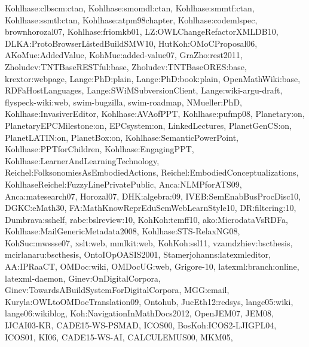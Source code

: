 {Kohlhase:clbscm:ctan,
Kohlhase:smomdl:ctan,
Kohlhase:smmtf:ctan,
Kohlhase:ssmtl:ctan,
Kohlhase:atpm98chapter,
Kohlhase:codemlspec,
brownhorozal07,
Kohlhase:friomkb01,
LZ:OWLChangeRefactorXMLDB10,
DLKA:ProtoBrowserListedBuildSMW10,
HutKoh:OMoCProposal06,
AKoMue:AddedValue,
KohMue:added-value07,
GraZho:rest2011,
Zholudev:TNTBaseRESTful:base,
Zholudev:TNTBaseORES:base,
krextor:webpage,
Lange:PhD:plain,
Lange:PhD:book:plain,
OpenMathWiki:base,
RDFaHostLanguages,
Lange:SWiMSubversionClient,
Lange:wiki-argu-draft,
flyspeck-wiki:web,
swim-bugzilla,
swim-roadmap,
NMueller:PhD,
Kohlhase:InvasiverEditor,
Kohlhase:AVAofPPT,
Kohlhase:pufmp08,
Planetary:on,
PlanetaryEPCMilestone:on,
EPCsystem:on,
LinkedLectures,
PlanetGenCS:on, 
PlanetLATIN:on,
PlanetBox:on,
Kohlhase:SemanticPowerPoint,
Kohlhase:PPTforChildren,
Kohlhase:EngagingPPT,
Kohlhase:LearnerAndLearningTechnology,
Reichel:FolksonomiesAsEmbodiedActions,
Reichel:EmbodiedConceptualizations,
KohlhaseReichel:FuzzyLinePrivatePublic,
Anca:NLMPforATS09,
Anca:matesearch07,
Horozal07,
DHK:algebra:09,
IVEB:SemEnabBusProcDisc10,
DGKC:eMath30,
FA:MathKnowReprEduSemWebLearnStyle10,
DR:filtering:10,
Dumbrava:sshelf,
rabe:bslreview:10,
KohKoh:tcmff10,
ako:MicrodataVsRDFa,
Kohlhase:MailGenericMetadata2008,
Kohlhase:STS-RelaxNG08,
KohSuc:mwssse07,
xslt:web,
mmlkit:web,
KohKoh:ssl11,
vzamdzhiev:bscthesis,
mcirlanaru:bscthesis,
OntoIOpOASIS2001,
Stamerjohanns:latexmleditor,
AA:IPRaaCT,
OMDoc:wiki,
OMDocUG:web,
Grigore-10,
latexml:branch:online,
latexml-daemon,
Ginev:OnDigitalCorpora,
Ginev:TowardsABuildSystemForDigitalCorpora,
MGG:email,
Kuryla:OWLtoOMDocTranslation09,
Ontohub,
JucEth12:redsys,
lange05:wiki,
lange06:wikiblog,
Koh:NavigationInMathDocs2012,
OpenJEM07,
JEM08,
IJCAI03-KR,
CADE15-WS-PSMAD,
ICOS00,
BosKoh:ICOS2-LJIGPL04,
ICOS01,
KI06,
CADE15-WS-AI,
CALCULEMUS00,
MKM05,
}
